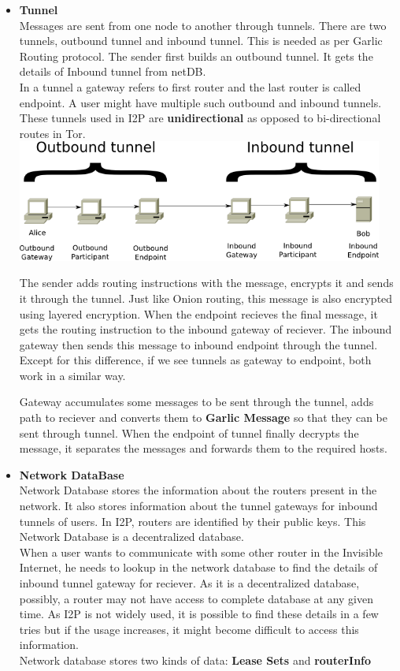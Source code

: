 \documentclass{main}
\begin{document}
\begin{itemize}
	\item \textbf{Tunnel} \\
		Messages are sent from one node to another through tunnels. There are two tunnels, outbound tunnel
		and inbound tunnel. This is needed as per Garlic Routing protocol. The sender first builds an 
		outbound tunnel. It gets the details of Inbound tunnel from netDB. \\
		In a tunnel a gateway refers to first router and the last router is called endpoint.
		A user might have multiple such outbound and inbound tunnels. These tunnels
		used in I2P are \textbf{unidirectional} as opposed to bi-directional routes in Tor. \\
		\includegraphics[width=0.95\textwidth]{Resources/images/i2p-tunnels.png}

		The sender adds routing instructions with the message, encrypts it and sends it through the tunnel.
		Just like Onion routing, this message is also encrypted using layered encryption. When the endpoint
		recieves the final message, it gets the routing instruction to the inbound gateway of reciever.
		The inbound gateway then sends this message to inbound endpoint through the tunnel. Except for this 
		difference, if we see tunnels as gateway to endpoint, both work in a similar way.

		Gateway accumulates some messages to be sent through the tunnel, adds path to reciever and
		converts them to \textbf{Garlic Message} so that they can be sent through tunnel.
		When the endpoint of tunnel finally decrypts the message, it separates the messages and forwards them 
		to the required hosts.
	\item \textbf{Network DataBase} \\
		Network Database stores the information about the routers present in the network. It also stores information
		about the tunnel gateways for inbound tunnels of users. In I2P, routers are identified by their public keys.
		This Network Database is a decentralized database. \\
		When a user wants to communicate with some other router in the Invisible Internet, he needs to lookup in the
		network database to find the details of inbound tunnel gateway for reciever. As it is a decentralized database,
		possibly, a router may not have access to complete database at any given time. As I2P is not widely used, it 
		is possible to find these details in a few tries but if the usage increases, it might become difficult to access
		this information.\\
		Network database stores two kinds of data: \textbf{Lease Sets} and \textbf{routerInfo}
\end{itemize}
\end{document}

